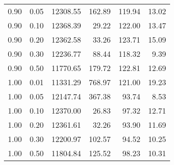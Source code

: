 \begin{table}
\begin{tabular}{rrrrrr}
0.90 & 0.05 & 12308.55 & 162.89 & 119.94 & 13.02 \\
0.90 & 0.10 & 12368.39 & 29.22 & 122.00 & 13.47 \\
0.90 & 0.20 & 12362.58 & 33.26 & 123.71 & 15.09 \\
0.90 & 0.30 & 12236.77 & 88.44 & 118.32 & 9.39 \\
0.90 & 0.50 & 11770.65 & 179.72 & 122.81 & 12.69 \\
1.00 & 0.01 & 11331.29 & 768.97 & 121.00 & 19.23 \\
1.00 & 0.05 & 12147.74 & 367.38 & 93.74 & 8.53 \\
1.00 & 0.10 & 12370.00 & 26.83 & 97.32 & 12.71 \\
1.00 & 0.20 & 12361.61 & 32.26 & 93.90 & 11.69 \\
1.00 & 0.30 & 12200.97 & 102.57 & 94.52 & 10.25 \\
1.00 & 0.50 & 11804.84 & 125.52 & 98.23 & 10.31 \\
\bottomrule
\end{tabular}
\end{table}
